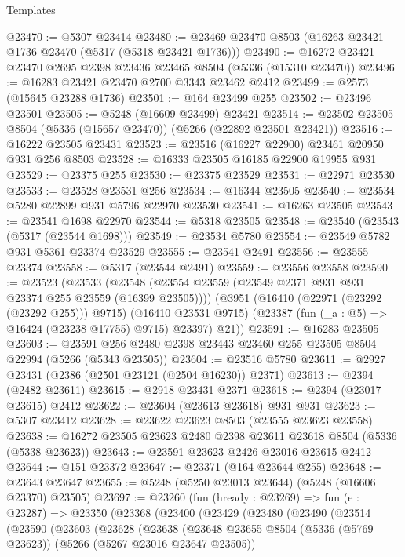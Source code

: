 \begin{lexlean}{Templates}
\begin{coremodule}
@23470 := @5307 @23414
@23480 := @23469 @23470 @8503 (@16263 @23421 @1736 @23470 (@5317 (@5318 @23421 @1736)))
@23490 := @16272 @23421 @23470 @2695 @2398 @23436 @23465 @8504 (@5336 (@15310 @23470))
@23496 := @16283 @23421 @23470 @2700 @3343 @23462 @2412
@23499 := @2573 (@15645 @23288 @1736)
@23501 := @164 @23499 @255
@23502 := @23496 @23501
@23505 := @5248 (@16609 @23499) @23421
@23514 := @23502 @23505 @8504 (@5336 (@15657 @23470)) (@5266 (@22892 @23501 @23421))
@23516 := @16222 @23505 @23431
@23523 := @23516 (@16227 @22900) @23461 @20950 @931 @256 @8503
@23528 := @16333 @23505 @16185 @22900 @19955 @931
@23529 := @23375 @255
@23530 := @23375 @23529
@23531 := @22971 @23530
@23533 := @23528 @23531 @256
@23534 := @16344 @23505
@23540 := @23534 @5280 @22899 @931 @5796 @22970 @23530
@23541 := @16263 @23505
@23543 := @23541 @1698 @22970
@23544 := @5318 @23505
@23548 := @23540 (@23543 (@5317 (@23544 @1698)))
@23549 := @23534 @5780
@23554 := @23549 @5782 @931 @5361 @23374 @23529
@23555 := @23541 @2491
@23556 := @23555 @23374
@23558 := @5317 (@23544 @2491)
@23559 := @23556 @23558
@23590 := @23523
    (@23533
      (@23548 (@23554 @23559 (@23549 @2371 @931 @931 @23374 @255 @23559 (@16399 @23505))))
      (@3951
        (@16410 (@22971 (@23292 (@23292 @255))) @9715)
        (@16410 @23531 @9715)
        (@23387 (fun (_a : @5) => @16424 (@23238 @17755) @9715) @23397)
        @21))
@23591 := @16283 @23505
@23603 := @23591 @256 @2480 @2398 @23443 @23460 @255 @23505 @8504 @22994 (@5266 (@5343 @23505))
@23604 := @23516 @5780
@23611 := @2927 @23431 (@2386 (@2501 @23121 (@2504 @16230)) @2371)
@23613 := @2394 (@2482 @23611)
@23615 := @2918 @23431 @2371
@23618 := @2394 (@23017 @23615) @2412
@23622 := @23604 (@23613 @23618) @931 @931
@23623 := @5307 @23412
@23628 := @23622 @23623 @8503 (@23555 @23623 @23558)
@23638 := @16272 @23505 @23623 @2480 @2398 @23611 @23618 @8504 (@5336 (@5338 @23623))
@23643 := @23591 @23623 @2426 @23016 @23615 @2412
@23644 := @151 @23372
@23647 := @23371 (@164 @23644 @255)
@23648 := @23643 @23647
@23655 := @5248 (@5250 @23013 @23644) (@5248 (@16606 @23370) @23505)
@23697 := @23260
    (fun (hready : @23269) =>
    fun (e : @23287) =>
    @23350
      (@23368
        (@23400
          (@23429
            (@23480
              (@23490
                (@23514
                  (@23590
                    (@23603
                      (@23628
                        (@23638
                          (@23648
                            @23655
                            @8504
                            (@5336 (@5769 @23623))
                            (@5266 (@5267 @23016 @23647 @23505))

\end{coremodule}
\end{lexlean}
